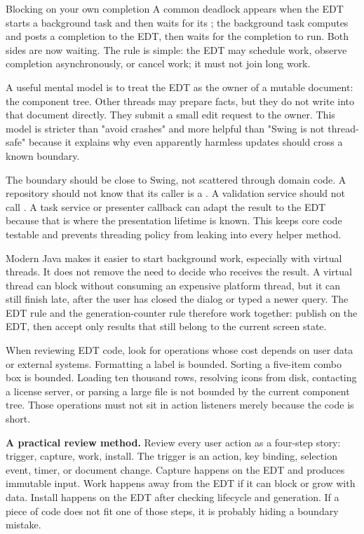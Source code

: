 \begin{pitfallbox}{Blocking on your own completion}
A common deadlock appears when the EDT starts a background task and then waits for its ; the background task computes and posts a completion to the EDT, then waits for the completion to run. Both sides are now waiting. The rule is simple: the EDT may schedule work, observe completion asynchronously, or cancel work; it must not join long work.
\end{pitfallbox}

A useful mental model is to treat the EDT as the owner of a mutable document:
the component tree. Other threads may prepare facts, but they do not write into
that document directly. They submit a small edit request to the owner. This
model is stricter than "avoid crashes" and more helpful than "Swing is not
thread-safe" because it explains why even apparently harmless updates should
cross a known boundary.

The boundary should be close to Swing, not scattered through domain code. A
repository should not know that its caller is a . A validation
service should not call . A task service or
presenter callback can adapt the result to the EDT because that is where the
presentation lifetime is known. This keeps core code testable and prevents
threading policy from leaking into every helper method.

Modern Java makes it easier to start background work, especially with virtual
threads. It does not remove the need to decide who receives the result. A
virtual thread can block without consuming an expensive platform thread, but it
can still finish late, after the user has closed the dialog or typed a newer
query. The EDT rule and the generation-counter rule therefore work together:
publish on the EDT, then accept only results that still belong to the current
screen state.

When reviewing EDT code, look for operations whose cost depends on user data or
external systems. Formatting a label is bounded. Sorting a five-item combo box
is bounded. Loading ten thousand rows, resolving icons from disk, contacting a
license server, or parsing a large file is not bounded by the current component
tree. Those operations must not sit in action listeners merely because the code
is short.

\textbf{A practical review method.} Review every user action as a four-step story: trigger, capture, work, install. The trigger is an action, key binding, selection event, timer, or document change. Capture happens on the EDT and produces immutable input. Work happens away from the EDT if it can block or grow with data. Install happens on the EDT after checking lifecycle and generation. If a piece of code does not fit one of those steps, it is probably hiding a boundary mistake.

